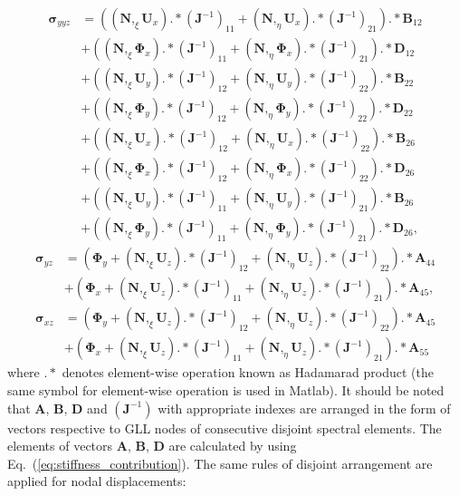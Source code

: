 \documentclass[preprint,12pt]{elsarticle}
\renewcommand{\vec}[1]{\mathbf{#1}}
\renewcommand{\bm}[1]{\mathbf{#1}}
\newcommand{\bs}[1]{\boldsymbol{#1}}
\begin{document}
	\begin{equation}
	\begin{split}
	\bs{\sigma}_{yyz}&=\left((\bm{N},_{\xi}\vec{U}_x).*(\vec{J}^{-1})_{11}+(\bm{N},_{\eta}\vec{U}_x).*(\vec{J}^{-1})_{21}\right).*\vec{B}_{12}\\
	&+\left((\bm{N},_{\xi}\bs{\Phi}_x).*(\vec{J}^{-1})_{11}+(\bm{N},_{\eta}\bs{\Phi}_x).*(\vec{J}^{-1})_{21}\right).*\vec{D}_{12}\\
	&+\left((\bm{N},_{\xi}\vec{U}_y).*(\vec{J}^{-1})_{12}+(\bm{N},_{\eta}\vec{U}_y).*(\vec{J}^{-1})_{22}\right).*\vec{B}_{22}\\
	&+\left((\bm{N},_{\xi}\bs{\Phi}_y).*(\vec{J}^{-1})_{12}+(\bm{N},_{\eta}\bs{\Phi}_y).*(\vec{J}^{-1})_{22}\right).*\vec{D}_{22}\\
	&+\left((\bm{N},_{\xi}\vec{U}_x).*(\vec{J}^{-1})_{12}+(\bm{N},_{\eta}\vec{U}_x).*(\vec{J}^{-1})_{22}\right).*\vec{B}_{26}\\
	&+\left((\bm{N},_{\xi}\bs{\Phi}_x).*(\vec{J}^{-1})_{12}+(\bm{N},_{\eta}\bs{\Phi}_x).*(\vec{J}^{-1})_{22}\right).*\vec{D}_{26}\\
	&+\left((\bm{N},_{\xi}\vec{U}_y).*(\vec{J}^{-1})_{11}+(\bm{N},_{\eta}\vec{U}_y).*(\vec{J}^{-1})_{21}\right).*\vec{B}_{26}\\
	&+\left((\bm{N},_{\xi}\bs{\Phi}_y).*(\vec{J}^{-1})_{11}+(\bm{N},_{\eta}\bs{\Phi}_y).*(\vec{J}^{-1})_{21}\right).*\vec{D}_{26},
	\end{split}
	\end{equation}
	\begin{equation}
	\begin{split}
	\bs{\sigma}_{yz}&=\left(\bs{\Phi}_y+(\bm{N},_{\xi}\vec{U}_z).*(\vec{J}^{-1})_{12}+(\bm{N},_{\eta}\vec{U}_z).*(\vec{J}^{-1})_{22}\right).*\vec{A}_{44}\\
	&+\left(\bs{\Phi}_x+(\bm{N},_{\xi}\vec{U}_z).*(\vec{J}^{-1})_{11}+(\bm{N},_{\eta}\vec{U}_z).*(\vec{J}^{-1})_{21}\right).*\vec{A}_{45},\\
	\bs{\sigma}_{xz}&=\left(\bs{\Phi}_y+(\bm{N},_{\xi}\vec{U}_z).*(\vec{J}^{-1})_{12}+(\bm{N},_{\eta}\vec{U}_z).*(\vec{J}^{-1})_{22}\right).*\vec{A}_{45}\\
	&+\left(\bs{\Phi}_x+(\bm{N},_{\xi}\vec{U}_z).*(\vec{J}^{-1})_{11}+(\bm{N},_{\eta}\vec{U}_z).*(\vec{J}^{-1})_{21}\right).*\vec{A}_{55}
	\end{split}
	\end{equation}
	where $.*$ denotes element-wise operation known as Hadamarad product (the same symbol for element-wise operation is used in Matlab). It should be noted that $\vec{A}$, $\vec{B}$, $\vec{D}$ and $(\vec{J}^{-1})$ with appropriate indexes are arranged in the form of vectors respective to GLL nodes of consecutive disjoint spectral elements. The elements of vectors  $\vec{A}$, $\vec{B}$, $\vec{D}$ are calculated by using Eq.~(\ref{eq:stiffness_contribution}). The same rules of disjoint arrangement are applied for nodal displacements:
\end{document}

